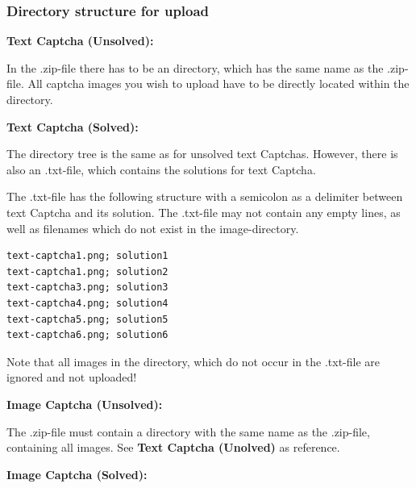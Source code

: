 \clearpage
\subsubsection{Directory structure for upload}

\textbf{Text Captcha (Unsolved):}

In the .zip-file there has to be an directory, which has the same name as the .zip-file. All captcha images you wish to upload have to be directly located within the directory.
\\

\textbf{Text Captcha (Solved):}

The directory tree is the same as for unsolved text Captchas. However, there is also an .txt-file, which contains the solutions for text Captcha.
\\

The .txt-file has the following structure with a semicolon as a delimiter between text Captcha and its solution. The .txt-file may not contain any empty lines, as well as filenames which do not exist in the image-directory.

\begin{lstlisting}
text-captcha1.png; solution1
text-captcha1.png; solution2
text-captcha3.png; solution3
text-captcha4.png; solution4
text-captcha5.png; solution5
text-captcha6.png; solution6
\end{lstlisting}

Note that all images in the directory, which do not occur in the .txt-file are ignored and not uploaded!

\clearpage
\textbf{Image Captcha (Unsolved):}

The .zip-file must contain a directory with the same name as the .zip-file, containing all images. See \textbf{Text Captcha (Unolved)} as reference.
\\

\textbf{Image Captcha (Solved):}
\\

